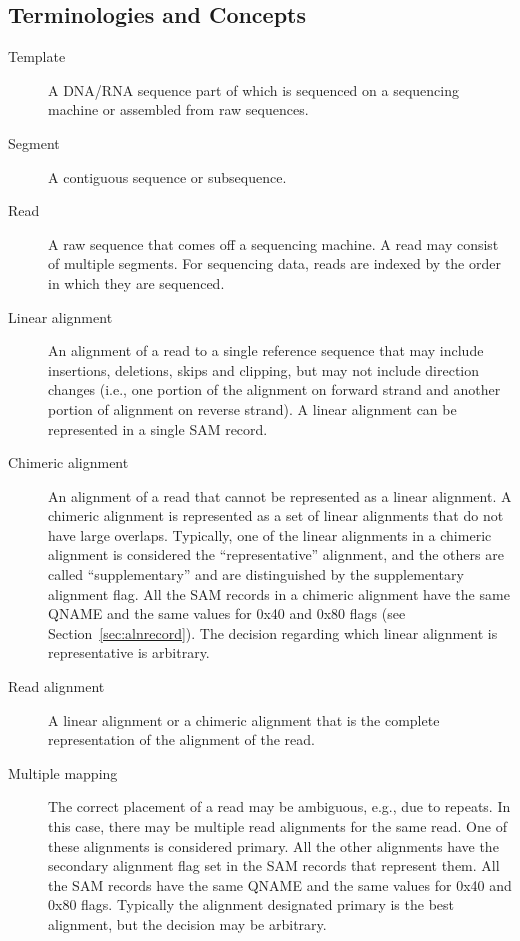 \documentclass[10pt]{article}
\begin{document}
\subsection{Terminologies and Concepts}

\begin{description}
\item[Template] A DNA/RNA sequence part of which is sequenced on a
  sequencing machine or assembled from raw sequences.

\item[Segment] A contiguous sequence or subsequence.

\item[Read] A raw sequence that comes off a sequencing machine. A read
  may consist of multiple segments. For sequencing data, reads are indexed by
  the order in which they are sequenced.

\item[Linear alignment]
  An alignment of a read to a single reference sequence that may include
  insertions, deletions, skips and clipping, but may not include direction
  changes (i.e., one portion of the alignment on forward strand and another
  portion of alignment on reverse strand). A linear alignment can be
  represented in a single SAM record.

\item[Chimeric alignment]
  An alignment of a read that cannot be represented as a linear alignment. A
  chimeric alignment is represented as a set of linear alignments that do not
  have large overlaps.  Typically, one of the linear alignments in a chimeric
  alignment is considered the ``representative'' alignment, and the others are
  called ``supplementary'' and are distinguished by the supplementary alignment
  flag.  All the SAM records in a chimeric alignment have the same {\sf QNAME}
  and the same values for 0x40 and 0x80 flags (see Section~\ref{sec:alnrecord}).
  The decision regarding which linear alignment is representative is arbitrary.

\item[Read alignment]
  A linear alignment or a chimeric alignment that is the complete
  representation of the alignment of the read.

\item[Multiple mapping]
  The correct placement of a read may be ambiguous, e.g., due to repeats.  In
  this case, there may be multiple read alignments for the same read.  One of
  these alignments is considered primary.  All the other alignments have the
  secondary alignment flag set in the SAM records that represent them.  All the
  SAM records have the same {\sf QNAME} and the same values for 0x40 and 0x80
  flags.  Typically the alignment designated primary is the best alignment, but
  the decision may be arbitrary.\footnotemark


\end{description}
\end{document}
